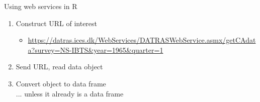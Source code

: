 \documentclass[aspectratio=169]{beamer}
\begin{document}



\begin{frame}{Using web services in R}\small
  \begin{enumerate}
    \item Construct URL of interest\\[0.5ex]
    \begin{itemize}\item[]
      \begin{minipage}{60ex}
        \setlength\parindent{-15pt}
        \scriptsize\blue\url{https://datras.ices.dk/WebServices/DATRASWebService.asmx/getCAdata?survey=NS-IBTS\&year=1965\&quarter=1}\\[3ex]
      \end{minipage}
    \end{itemize}
    \item Send URL, read data object\\[6ex]
    \item Convert object to data frame\\[0.5ex]
    \quad\gray\footnotesize ... unless it already is a data frame\\[1ex]
  \end{enumerate}
\end{frame}

\end{document}
